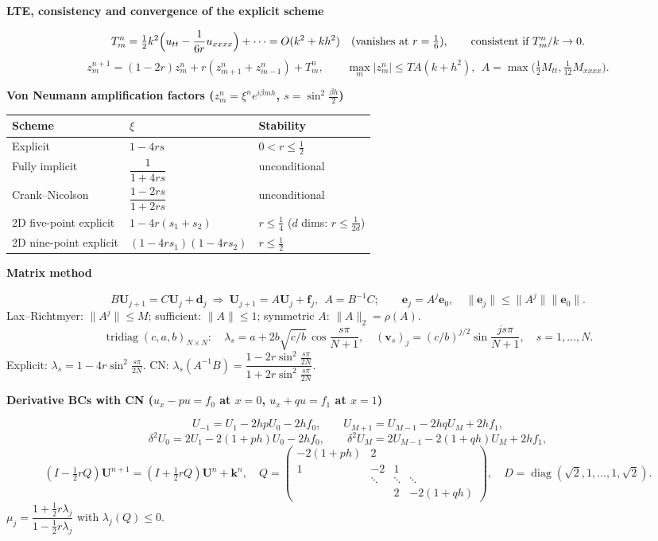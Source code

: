 \documentclass[10pt,a4paper]{article}
\newcommand{\head}[1]{\par\smallskip\noindent\textbf{\color{blue!50!black}#1}\par\nobreak}
\begin{document}
\head{LTE, consistency and convergence of the explicit scheme}
\[
  T_m^n=\tfrac12k^2\Bigl(u_{tt}-\frac1{6r}u_{xxxx}\Bigr)+\cdots=O(k^2+kh^2)
  \quad(\text{vanishes at }r=\tfrac16),
  \qquad
  \text{consistent if } T_m^n/k\to0.
\]
\[
  z_m^{n+1}=(1-2r)z_m^n+r(z_{m+1}^n+z_{m-1}^n)+T_m^n,
  \qquad
  \max_m|z_m^n|\le TA(k+h^2),\ \ A=\max\bigl(\tfrac12M_{tt},\tfrac1{12}M_{xxxx}\bigr).
\]

\head{Von Neumann amplification factors (\(z_m^n=\xi^ne^{i\beta mh}\), \(s=\sin^2\frac{\beta h}2\))}
\begin{center}
\renewcommand{\arraystretch}{1.35}
\begin{tabular}{@{}lll@{}}
\toprule
Scheme & \(\xi\) & Stability\\
\midrule
Explicit & \(1-4rs\) & \(0<r\le\frac12\)\\
Fully implicit & \(\dfrac1{1+4rs}\) & unconditional\\
Crank--Nicolson & \(\dfrac{1-2rs}{1+2rs}\) & unconditional\\
2D five-point explicit & \(1-4r(s_1+s_2)\) & \(r\le\frac14\) (\(d\) dims: \(r\le\frac1{2d}\))\\
2D nine-point explicit & \((1-4rs_1)(1-4rs_2)\) & \(r\le\frac12\)\\
\bottomrule
\end{tabular}
\end{center}

\head{Matrix method}
\[
  B\mathbf U_{j+1}=C\mathbf U_j+\mathbf d_j\ \Rightarrow\
  \mathbf U_{j+1}=A\mathbf U_j+\mathbf f_j,\ \ A=B^{-1}C;
  \qquad
  \mathbf e_j=A^j\mathbf e_0,\quad \|\mathbf e_j\|\le\|A^j\|\|\mathbf e_0\|.
\]
Lax--Richtmyer: \(\|A^j\|\le M\);\; sufficient: \(\|A\|\le1\);\;
symmetric \(A\): \(\|A\|_2=\rho(A)\).
\[
  \operatorname{tridiag}(c,a,b)_{N\times N}:\quad
  \lambda_s=a+2b\sqrt{c/b}\,\cos\frac{s\pi}{N+1},\quad
  (\mathbf v_s)_j=(c/b)^{j/2}\sin\frac{js\pi}{N+1},\quad s=1,\dots,N.
\]
Explicit: \(\lambda_s=1-4r\sin^2\frac{s\pi}{2N}\).\;
CN: \(\lambda_s(A^{-1}B)=\dfrac{1-2r\sin^2\frac{s\pi}{2N}}{1+2r\sin^2\frac{s\pi}{2N}}\).

\head{Derivative BCs with CN (\(u_x-pu=f_0\) at \(x=0\), \(u_x+qu=f_1\) at \(x=1\))}
\[
  U_{-1}=U_1-2hpU_0-2hf_0,\qquad U_{M+1}=U_{M-1}-2hqU_M+2hf_1,
\]
\[
  \delta^2U_0=2U_1-2(1+ph)U_0-2hf_0,\qquad
  \delta^2U_M=2U_{M-1}-2(1+qh)U_M+2hf_1,
\]
\[
  (I-\tfrac12rQ)\mathbf U^{n+1}=(I+\tfrac12rQ)\mathbf U^n+\mathbf k^n,\quad
  Q=\begin{pmatrix}-2(1+ph)&2&&\\1&-2&1&\\&\ddots&\ddots&\ddots\\&&2&-2(1+qh)\end{pmatrix},\quad
  D=\operatorname{diag}(\sqrt2,1,\dots,1,\sqrt2).
\]
\(\mu_j=\dfrac{1+\frac12r\lambda_j}{1-\frac12r\lambda_j}\) with \(\lambda_j(Q)\le0\).
\end{document}
